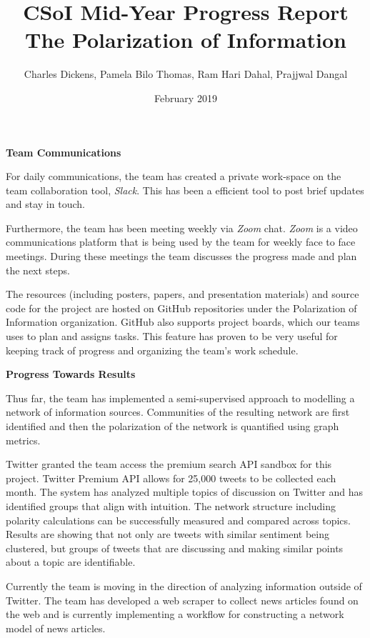 \documentclass{article}
\title{CSoI Mid-Year Progress Report\\
The Polarization of Information}
\author{Charles Dickens, Pamela Bilo Thomas, Ram Hari Dahal, Prajjwal Dangal}
\date{February 2019}
\begin{document}
\maketitle

\par \noindent \textbf{Team Communications}

\par For daily communications, the team has created a private work-space on the team collaboration tool, \textit{Slack}. This has been a efficient tool to post brief updates and stay in touch. 
\par Furthermore, the team has been meeting weekly via \textit{Zoom} chat. \textit{Zoom} is a video communications platform that is being used by the team for weekly face to face meetings. During these meetings the team discusses the progress made and plan the next steps.
\par The resources (including posters, papers, and presentation materials) and source code for the project are hosted on GitHub repositories under the Polarization of Information organization. GitHub also supports project boards, which our teams uses to plan and assigns tasks. This feature has proven to be very useful for keeping track of progress and organizing the team's work schedule. 

\vspace{0.5cm}

\par \noindent \textbf{Progress Towards Results}

\par Thus far, the team has implemented a semi-supervised approach to modelling a network of information sources. Communities of the resulting network are first identified and then the polarization of the network is quantified using graph metrics. 

\par Twitter granted the team access the premium search API sandbox for this project. Twitter Premium API allows for 25,000 tweets to be collected each month. The system has analyzed multiple topics of discussion on Twitter and has identified groups that align with intuition. The network structure including polarity calculations can be successfully measured and compared across topics. Results are showing that not only are tweets with similar sentiment being clustered, but groups of tweets that are discussing and making similar points about a topic are identifiable.  

\par Currently the team is moving in the direction of analyzing information outside of Twitter. The team has developed a web scraper to collect news articles found on the web and is currently implementing a workflow for constructing a network model of news articles.
\end{document}
